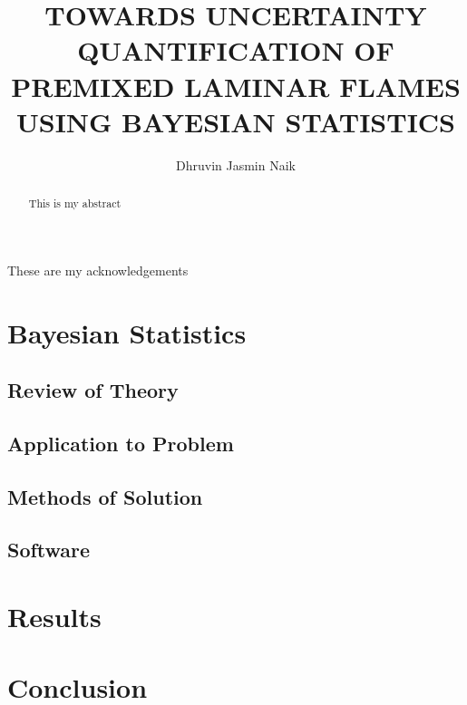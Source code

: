 \documentclass[10pt]{ubthesis}
\title{TOWARDS UNCERTAINTY QUANTIFICATION OF PREMIXED LAMINAR FLAMES USING BAYESIAN STATISTICS}
\author{Dhruvin Jasmin Naik}
\begin{document}
\begin{titlepage}
\maketitle
\end{titlepage}

\begin{ubfrontmatter}
\makecopyright
\cleardoublepage
\begin{acknowledgements}
These are my acknowledgements
\end{acknowledgements}
\tableofcontents

\cleardoublepage
\listoffigures
\cleardoublepage
\listoftables
\cleardoublepage
\begin{abstract}
This is my abstract
\end{abstract}
\end{ubfrontmatter}






\chapter{Bayesian Statistics}
\section{Review of Theory}
\section{Application to Problem}
\section{Methods of Solution}
\section{Software}
\chapter{Results}
\chapter{Conclusion}
%
%
\end{document}
